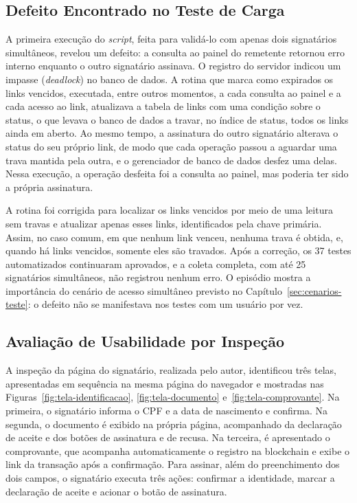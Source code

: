 \documentclass[
    12pt,
    a4paper,
    oneside,
    chapter=TITLE,
    section=TITLE,
    subsection=TITLE,
    subsubsection=TITLE,
    sumario=tradicional,
    english,
    brazil
]{abntex2}
\begin{document}
\subsection{Defeito Encontrado no Teste de Carga}
\label{sec:res-defeito}

A primeira execução do \emph{script}, feita para validá-lo com apenas dois signatários simultâneos, revelou um defeito: a consulta ao painel do remetente retornou erro interno enquanto o outro signatário assinava. O registro do servidor indicou um impasse (\emph{deadlock}) no banco de dados. A rotina que marca como expirados os links vencidos, executada, entre outros momentos, a cada consulta ao painel e a cada acesso ao link, atualizava a tabela de links com uma condição sobre o status, o que levava o banco de dados a travar, no índice de status, todos os links ainda em aberto. Ao mesmo tempo, a assinatura do outro signatário alterava o status do seu próprio link, de modo que cada operação passou a aguardar uma trava mantida pela outra, e o gerenciador de banco de dados desfez uma delas. Nessa execução, a operação desfeita foi a consulta ao painel, mas poderia ter sido a própria assinatura.

A rotina foi corrigida para localizar os links vencidos por meio de uma leitura sem travas e atualizar apenas esses links, identificados pela chave primária. Assim, no caso comum, em que nenhum link venceu, nenhuma trava é obtida, e, quando há links vencidos, somente eles são travados. Após a correção, os 37 testes automatizados continuaram aprovados, e a coleta completa, com até 25 signatários simultâneos, não registrou nenhum erro. O episódio mostra a importância do cenário de acesso simultâneo previsto no Capítulo~\ref{sec:cenarios-teste}: o defeito não se manifestava nos testes com um usuário por vez.

\subsection{Avaliação de Usabilidade por Inspeção}
\label{sec:res-usabilidade}

A inspeção da página do signatário, realizada pelo autor, identificou três telas, apresentadas em sequência na mesma página do navegador e mostradas nas Figuras~\ref{fig:tela-identificacao}, \ref{fig:tela-documento} e~\ref{fig:tela-comprovante}. Na primeira, o signatário informa o CPF e a data de nascimento e confirma. Na segunda, o documento é exibido na própria página, acompanhado da declaração de aceite e dos botões de assinatura e de recusa. Na terceira, é apresentado o comprovante, que acompanha automaticamente o registro na blockchain e exibe o link da transação após a confirmação. Para assinar, além do preenchimento dos dois campos, o signatário executa três ações: confirmar a identidade, marcar a declaração de aceite e acionar o botão de assinatura.
\end{document}
